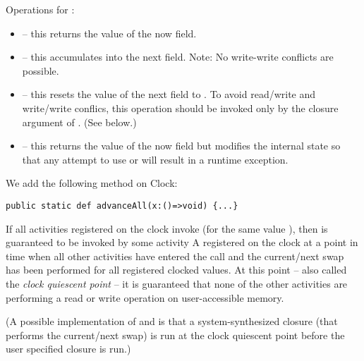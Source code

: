 Operations for :
\begin{itemize}
\item {} -- this returns the value of the now field. 
\item{} -- this accumulates  into the next field. Note: No
     write-write conflicts are possible.
\item{} -- this resets the value of the next field to . To avoid
     read/write and write/write conflics, this operation should be
     invoked only by the closure argument of
     . (See below.)
\item {} -- this returns the value of the now field but
     modifies the internal state so that any attempt to use  
     or  will result in a runtime exception.
\end{itemize}

We add the following method on Clock:
\begin{lstlisting}
public static def advanceAll(x:()=>void) {...}
\end{lstlisting}

If all activities registered on the clock invoke 
(for the same value ), then  is guaranteed to be
invoked by some activity A registered on the clock at a point in time
when all other activities have entered the  call
and the current/next swap has been performed for all registered
clocked values.  At this point -- also called the {\em clock quiescent
point} -- it is guaranteed that none of the other activities are
performing a read or write operation on user-accessible memory.

(A possible implementation of  and
 is that a system-synthesized closure (that
performs the current/next swap) is run at the clock quiescent point
before the user specified closure is run.)

